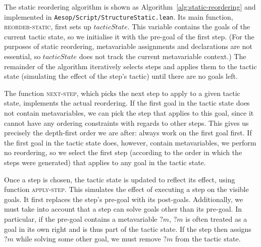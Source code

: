 \documentclass[sigplan,10pt,anonymous,review]{acmart}
\newcommand{\mvar}[1]{{?#1}}
\begin{document}
The static reordering algorithm is shown as Algorithm~\ref{alg:static-reordering} and implemented in \texttt{Aesop/Script/StructureStatic.lean}.
Its main function, \textsc{reorder-static}, first sets up $\mathit{tacticState}$.
This variable contains the goals of the current tactic state, so we initialise it with the pre-goal of the first step.
(For the purposes of static reordering, metavariable assignments and declarations are not essential, so $\mathit{tacticState}$ does not track the current metavariable context.)
The remainder of the algorithm iteratively selects steps and applies them to the tactic state (simulating the effect of the step's tactic) until there are no goals left.

The function \textsc{next-step}, which picks the next step to apply to a given tactic state, implements the actual reordering.
If the first goal in the tactic state does not contain metavariables, we can pick the step that applies to this goal, since it cannot have any ordering constraints with regards to other steps.
This gives us precisely the depth-first order we are after: always work on the first goal first.
If the first goal in the tactic state does, however, contain metavariables, we perform no reordering, so we select the first step (according to the order in which the steps were generated) that applies to any goal in the tactic state.

Once a step is chosen, the tactic state is updated to reflect its effect, using function \textsc{apply-step}.
This simulates the effect of executing a step on the visible goals.
It first replaces the step's pre-goal with its post-goals.
Additionally, we must take into account that a step can solve goals other than its pre-goal.
In particular, if the pre-goal contains a metavariable $\mvar{m}$, $\mvar{m}$ is often treated as a goal in its own right and is thus part of the tactic state.
If the step then assigns $\mvar{m}$ while solving some other goal, we must remove $\mvar{m}$ from the tactic state.
\end{document}
